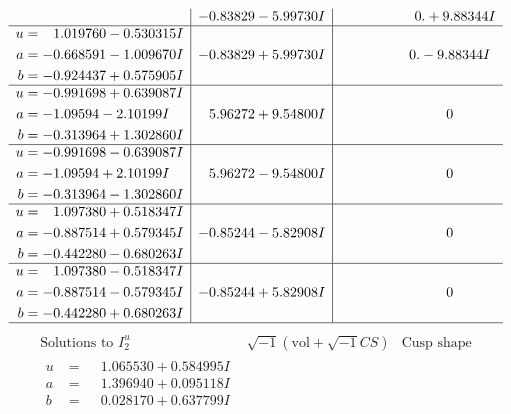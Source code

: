 \documentclass[1p]{elsarticle_modified}
\theoremstyle{definition}
\newcommand{\I}{\sqrt{-1}}
\begin{document}
$$\begin{array}{c|c|c}
 & -0.83829 - 5.99730 I & \phantom{-0.000000 -}0. + 9.88344 I \\ \hline\begin{aligned}
u &= \phantom{-}1.019760 - 0.530315 I \\
a &= -0.668591 - 1.009670 I \\
b &= -0.924437 + 0.575905 I\end{aligned}
 & -0.83829 + 5.99730 I & \phantom{-0.000000 } 0. - 9.88344 I \\ \hline\begin{aligned}
u &= -0.991698 + 0.639087 I \\
a &= -1.09594 - 2.10199 I \\
b &= -0.313964 + 1.302860 I\end{aligned}
 & \phantom{-}5.96272 + 9.54800 I & \phantom{-0.000000 } 0 \\ \hline\begin{aligned}
u &= -0.991698 - 0.639087 I \\
a &= -1.09594 + 2.10199 I \\
b &= -0.313964 - 1.302860 I\end{aligned}
 & \phantom{-}5.96272 - 9.54800 I & \phantom{-0.000000 } 0 \\ \hline\begin{aligned}
u &= \phantom{-}1.097380 + 0.518347 I \\
a &= -0.887514 + 0.579345 I \\
b &= -0.442280 - 0.680263 I\end{aligned}
 & -0.85244 - 5.82908 I & \phantom{-0.000000 } 0 \\ \hline\begin{aligned}
u &= \phantom{-}1.097380 - 0.518347 I \\
a &= -0.887514 - 0.579345 I \\
b &= -0.442280 + 0.680263 I\end{aligned}
 & -0.85244 + 5.82908 I & \phantom{-0.000000 } 0\\
 \hline 
 \end{array}$$\newpage$$\begin{array}{c|c|c}  
\text{Solutions to }I^u_{2}& \I (\text{vol} + \sqrt{-1}CS) & \text{Cusp shape}\\
 \hline 
\begin{aligned}
u &= \phantom{-}1.065530 + 0.584995 I \\
a &= \phantom{-}1.396940 + 0.095118 I \\
b &= \phantom{-}0.028170 + 0.637799 I\end{aligned}

\end{array}$$
\end{document}
